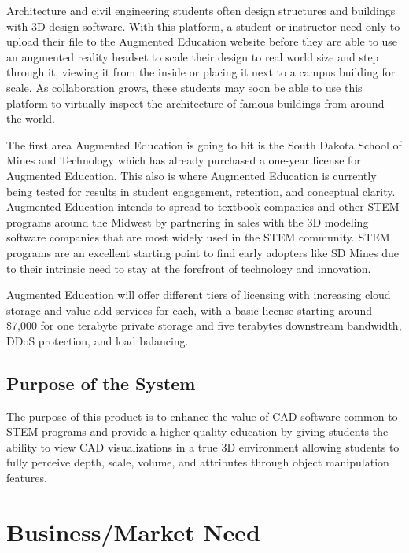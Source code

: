 Architecture and civil engineering students often design structures and buildings with 3D design software. With this platform, a student or instructor need only to upload their file to the Augmented Education website before they are able to use an augmented reality headset to scale their design to real world size and step through it, viewing it from the inside or placing it next to a campus building for scale. As collaboration grows, these students may soon be able to use this platform to virtually inspect the architecture of famous buildings from around the world. 

The first area Augmented Education is going to hit is the South Dakota School of Mines and Technology which has already purchased a one-year license for Augmented Education. This also is where Augmented Education is currently being tested for results in student engagement, retention, and conceptual clarity. Augmented Education intends to spread to textbook companies and other STEM programs around the Midwest by partnering in sales with the 3D modeling software companies that are most widely used in the STEM community. STEM programs are an excellent starting point to find early adopters like SD Mines due to their intrinsic need to stay at the forefront of technology and innovation. 

Augmented Education will offer different tiers of licensing with increasing cloud storage and value-add services for each, with a basic license starting around \$7,000 for one terabyte private storage and five terabytes downstream bandwidth, DDoS protection, and load balancing. 


\subsection{Purpose of the System}

The purpose of this product is to enhance the value of CAD software common to STEM programs and provide a higher quality education by giving students the ability to view CAD visualizations in a true 3D environment allowing students to fully perceive depth, scale, volume, and attributes through object manipulation features.


\section{Business/Market Need}

